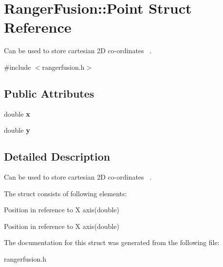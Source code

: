 \hypertarget{struct_ranger_fusion_1_1_point}{}\section{Ranger\+Fusion\+:\+:Point Struct Reference}
\label{struct_ranger_fusion_1_1_point}


Can be used to store cartesian 2D co-\/ordinates~\newline
.  




{\ttfamily \#include $<$rangerfusion.\+h$>$}

\subsection*{Public Attributes}
\begin{DoxyCompactItemize}
\item 
double {\bfseries x}\hypertarget{struct_ranger_fusion_1_1_point_aad4a1484b0897795f2cf1c425054439a}{}\label{struct_ranger_fusion_1_1_point_aad4a1484b0897795f2cf1c425054439a}

\item 
double {\bfseries y}\hypertarget{struct_ranger_fusion_1_1_point_a7684058bf1b973f45620ab211bf1c4eb}{}\label{struct_ranger_fusion_1_1_point_a7684058bf1b973f45620ab211bf1c4eb}

\end{DoxyCompactItemize}


\subsection{Detailed Description}
Can be used to store cartesian 2D co-\/ordinates~\newline
. 

The struct consists of following elements\+:~\newline

\begin{DoxyItemize}
\item Position in reference to X axis(double)~\newline

\item Position in reference to X axis(double)~\newline

\end{DoxyItemize}

The documentation for this struct was generated from the following file\+:\begin{DoxyCompactItemize}
\item 
rangerfusion.\+h\end{DoxyCompactItemize}

